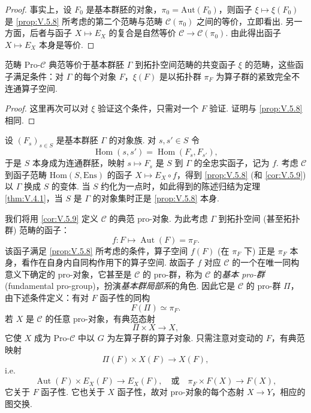 \begin{proof}
事实上，设 $F_0$ 是基本群胚的对象，$\pi_0 = \mathrm{Aut}(F_0)$，则函子 $\xi \mapsto \xi(F_0)$ 是 \ref{prop:V.5.8} 所考虑的第二个范畴与范畴 $\mathcal{C}(\pi_0)$ 之间的等价，立即看出. 另一方面，后者与函子 $X \mapsto E_X$ 的复合是自然等价 $\mathcal{C} \to \mathcal{C}(\pi_0)$. 由此得出函子 $X \mapsto E_X$ 本身是等价.
\end{proof}

\begin{corollary}\label{cor:V.5.9}
范畴 Pro-$\mathcal{C}$ 典范等价于基本群胚 $\Gamma$ 到拓扑空间范畴的共变函子 $\xi$ 的范畴，这些函子满足条件：对 $\Gamma$ 的每个对象 $F$，$\xi(F)$ 是以拓扑群 $\pi_F$ 为算子群的紧致完全不连通算子空间.
\end{corollary}

\begin{proof}
这里再次可以对 $\xi$ 验证这个条件，只需对一个 $F$ 验证. 证明与 \ref{prop:V.5.8} 相同.
\end{proof}

\begin{remark}\label{rem:V.5.10}
设 $(F_s)_{s \in S}$ 是基本群胚 $\Gamma$ 的对象族. 对 $s, s' \in S$ 令
\[
\operatorname{Hom}(s, s') = \operatorname{Hom}(F_s, F_{s'}),
\]
于是 $S$ 本身成为连通群胚，映射 $s \mapsto F_s$ 是 $S$ 到 $\Gamma$ 的全忠实函子，记为 $f$. 考虑 $\mathcal{C}$ 到函子范畴 $\mathrm{Hom}(S, \mathrm{Ens})$ 的函子 $X \mapsto E_X \circ f$，得到 \ref{prop:V.5.8} (和 \ref{cor:V.5.9}) 以 $\Gamma$ 换成 $S$ 的变体. 当 $S$ 约化为一点时，如此得到的陈述归结为定理 \ref{thm:V.4.1}，当 $S$ 是 $\Gamma$ 的对象集时正是 \ref{prop:V.5.8} 本身.
\end{remark}

我们将用 \ref{cor:V.5.9} 定义 $\mathcal{C}$ 的典范 pro-对象. 为此考虑 $\Gamma$ 到拓扑空间 (甚至拓扑群) 范畴的函子：
\[
f \colon F \longmapsto \operatorname{Aut}(F) = \pi_F.
\]
该函子满足 \ref{prop:V.5.8} 所考虑的条件，算子空间 $f(F)$ (在 $\pi_F$ 下) 正是 $\pi_F$ 本身，看作在自身内自同构作用下的算子空间. 故函子 $f$ 对应 $\mathcal{C}$ 的一个在唯一同构意义下确定的 pro-对象，它甚至是 $\mathcal{C}$ 的 pro-群，称为 $\mathcal{C}$ 的\emph{基本 pro-群} (fundamental pro-group)，扮演\emph{基本群局部系}的角色. 因此它是 $\mathcal{C}$ 的 pro-群 $\Pi$，由下述条件定义：有对 $F$ 函子性的同构
\[
F(\Pi) \simeq \pi_F.
\]
若 $X$ 是 $\mathcal{C}$ 的任意 pro-对象，有典范态射
\[
\Pi \times X \longrightarrow X,
\]
它使 $X$ 成为 Pro-$\mathcal{C}$ 中以 $G$ 为左算子群的算子对象. 只需注意对变动的 $F$，有典范映射
\[
\Pi(F) \times X(F) \longrightarrow X(F),
\]
i.e.
\[
\operatorname{Aut}(F) \times E_X(F) \longrightarrow E_X(F), \quad \text{或} \quad \pi_F \times F(X) \longrightarrow F(X),
\]
它关于 $F$ 函子性. 它也关于 $X$ 函子性，故对 pro-对象的每个态射 $X \to Y$，相应的图交换.

